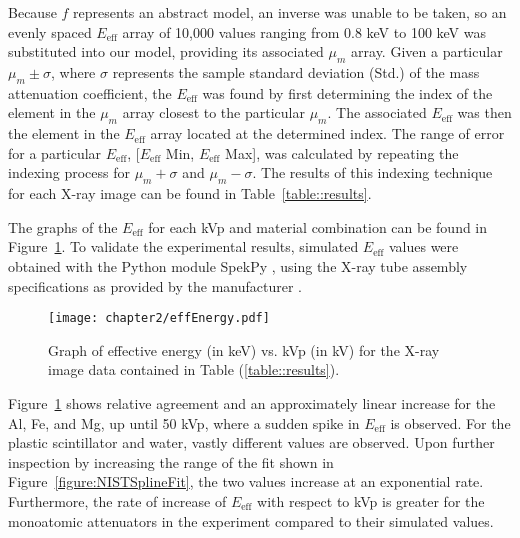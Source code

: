 \par Because $f$ represents an abstract model, an inverse was unable to be taken, so an evenly spaced $E_{\text{eff}}$ array of 10,000 values ranging from 0.8 keV to 100 keV was substituted into our model, providing its associated $\mu_m$ array. Given a particular $\mu_m \pm \sigma$, where $\sigma$ represents the sample standard deviation (Std.) of the mass attenuation coefficient, the $E_{\text{eff}}$ was found by first determining the index of the element in the $\mu_m$ array closest to the particular $\mu_m$. The associated $E_{\text{eff}}$ was then the element in the $E_{\text{eff}}$ array located at the determined index. The range of error for a particular $E_{\text{eff}}$, [$E_{\text{eff}}$ Min, $E_{\text{eff}}$ Max], was calculated by repeating the indexing process for $\mu_m + \sigma$ and $\mu_m - \sigma$. The results of this indexing technique for each X-ray image can be found in Table~\ref{table::results}.


\begin{table}[H]
    \small
    \noindent\makebox[\textwidth]{%
    
    }
    \caption{The results for each non-saturated (intensities not equal to 0 or 1) X-ray image for the composition experiment.}
    \label{table::results}
\end{table}


\par The graphs of the $E_{\text{eff}}$ for each kVp and material combination can be found in Figure~\ref{figure::results}. To validate the experimental results, simulated $E_{\text{eff}}$ values were obtained with the Python module SpekPy \cite{SpekPy}, using the X-ray tube assembly specifications as provided by the manufacturer \cite{CArm}.


\begin{figure}[H]
    \centering
    \texttt{[image: chapter2/effEnergy.pdf]}
    \caption{Graph of effective energy (in keV) vs. kVp (in kV) for the X-ray image data contained in Table (\ref{table::results}).}
    \label{figure::results}
\end{figure}

\par Figure~\ref{figure::results} shows relative agreement and an approximately linear increase for the Al, Fe, and Mg, up until 50 kVp, where a sudden spike in $E_{\text{eff}}$ is observed. For the plastic scintillator and water, vastly different values are observed. Upon further inspection by increasing the range of the fit shown in Figure~\ref{figure:NISTSplineFit}, the two values increase at an exponential rate. Furthermore, the rate of increase of $E_{\text{eff}}$ with respect to kVp is greater for the monoatomic attenuators in the experiment compared to their simulated values.

